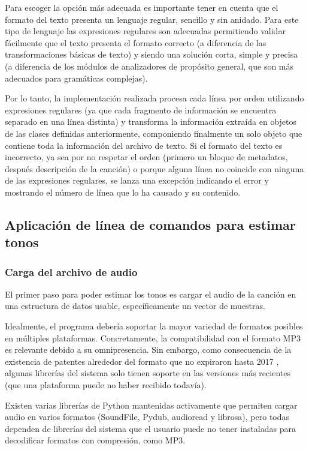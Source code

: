 Para escoger la opción más adecuada es importante tener en cuenta que el formato del texto presenta un lenguaje regular, sencillo y sin anidado. Para este tipo de lenguaje las expresiones regulares son adecuadas permitiendo validar fácilmente que el texto presenta el formato correcto (a diferencia de las transformaciones básicas de texto) y siendo una solución corta, simple y precisa (a diferencia de los módulos de analizadores de propósito general, que son más adecuados para gramáticas complejas).

Por lo tanto, la implementación realizada procesa cada línea por orden utilizando expresiones regulares (ya que cada fragmento de información se encuentra separado en una línea distinta) y transforma la información extraída en objetos de las clases definidas anteriormente, componiendo finalmente un solo objeto que contiene toda la información del archivo de texto.  Si el formato del texto es incorrecto, ya sea por no respetar el orden (primero un bloque de metadatos, después descripción de la canción) o porque alguna línea no coincide con ninguna de las expresiones regulares, se lanza una excepción indicando el error y mostrando el número de línea que lo ha causado y su contenido.


\subsection{Aplicación de línea de comandos para estimar tonos}

\subsubsection{Carga del archivo de audio}

El primer paso para poder estimar los tonos es cargar el audio de la canción en una estructura de datos usable, específicamente un vector de muestras.

Idealmente, el programa debería soportar la mayor variedad de formatos posibles en múltiples plataformas. Concretamente, la compatibilidad con el formato MP3 es relevante debido a su omnipresencia. Sin embargo, como consecuencia de la existencia de patentes alrededor del formato que no expiraron hasta 2017 \cite{mp3patents}, algunas librerías del sistema solo tienen soporte en las versiones más recientes (que una plataforma puede no haber recibido todavía).

Existen varias librerías de Python mantenidas activamente que permiten cargar audio en varios formatos (SoundFile, Pydub, audioread y librosa), pero todas dependen de librerías del sistema que el usuario puede no tener instaladas para decodificar formatos con compresión, como MP3.

